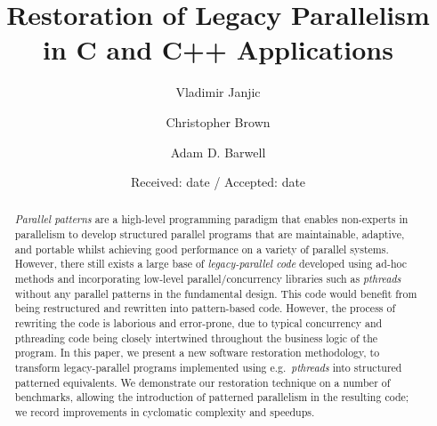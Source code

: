 \documentclass[smallextended]{svjour3}
\begin{document}
\title{Restoration of Legacy Parallelism in C and C++ Applications}
%
%
\author{Vladimir Janjic         \and
	Christopher Brown \and 
	Adam D. Barwell \and
}



\date{Received: date / Accepted: date}

\maketitle
%
\begin{abstract}
    \emph{Parallel patterns} are a high-level programming paradigm that enables non-experts in parallelism to develop structured parallel programs that are maintainable, adaptive, and portable whilst achieving good performance on a variety of parallel systems. However, there still exists a large base of \emph{legacy-parallel code} developed using ad-hoc methods and incorporating low-level parallel/concurrency libraries such as \emph{pthreads} without any parallel patterns in the fundamental design. This code would benefit from being restructured and rewritten into pattern-based code. However, the process of rewriting the code is laborious and error-prone, due to typical concurrency and pthreading code being closely intertwined throughout the business logic of the program. In this paper, we present a new software restoration methodology, to transform legacy-parallel programs implemented using e.g.\ \emph{pthreads} into structured patterned equivalents. We demonstrate our restoration technique on a number of benchmarks, allowing the introduction of patterned parallelism in the resulting code; we record improvements in cyclomatic complexity and speedups.

\end{abstract}

%
%




\end{document}
